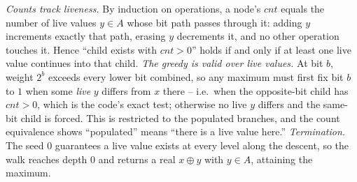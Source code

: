 \begin{proofbox}
\emph{Counts track liveness.} By induction on operations, a node's $\mathit{cnt}$ equals the number of live
values $y \in A$ whose bit path passes through it: adding $y$ increments exactly that path, erasing $y$
decrements it, and no other operation touches it. Hence ``child exists with $\mathit{cnt}>0$'' holds if and
only if at least one live value continues into that child. \emph{The greedy is valid over live values.} At
bit $b$, weight $2^b$ exceeds every lower bit combined, so any maximum must first fix bit $b$ to $1$ when
some \emph{live} $y$ differs from $x$ there -- i.e.\ when the opposite-bit child has $\mathit{cnt}>0$, which
is the code's exact test; otherwise no live $y$ differs and the same-bit child is forced. This is
 restricted to the populated branches, and the count equivalence shows ``populated''
means ``there is a live value here.'' \emph{Termination.} The seed $0$ guarantees a live value exists at
every level along the descent, so the walk reaches depth $0$ and returns a real $x \oplus y$ with $y \in A$,
attaining the maximum.
\end{proofbox}

